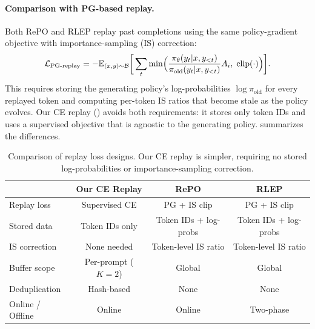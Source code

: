 \paragraph{Comparison with PG-based replay.}
Both RePO \citep{li2025repo} and RLEP \citep{zhang2025rlep} replay past completions using the same policy-gradient objective with importance-sampling (IS) correction:
\[
\mathcal{L}_{\mathrm{PG\text{-}replay}} = -\mathbb{E}_{(x,y)\sim\mathcal{B}}\bigg[\sum_t \min\!\Big(\frac{\pi_{\theta}(y_t|x,y_{<t})}{\pi_{\mathrm{old}}(y_t|x,y_{<t})} A_i,\;\mathrm{clip}(\cdot)\Big)\bigg].
\]
This requires storing the generating policy's log-probabilities $\log\pi_{\mathrm{old}}$ for every replayed token and computing per-token IS ratios that become stale as the policy evolves.
Our CE replay () avoids both requirements: it stores only token IDs and uses a supervised objective that is agnostic to the generating policy.
 summarizes the differences.

\begin{table}[t]
\centering
\caption{Comparison of replay loss designs. Our CE replay is simpler, requiring no stored log-probabilities or importance-sampling correction.}
\label{tab:replay_compare}
\small
\begin{tabular}{lccc}
\toprule
& \textbf{Our CE Replay} & \textbf{RePO} & \textbf{RLEP} \\
\midrule
Replay loss & Supervised CE & PG + IS clip & PG + IS clip \\
Stored data & Token IDs only & Token IDs + log-probs & Token IDs + log-probs \\
IS correction & None needed & Token-level IS ratio & Token-level IS ratio \\
Buffer scope & Per-prompt ($K{=}2$) & Global & Global \\
Deduplication & Hash-based & None & None \\
Online / Offline & Online & Online & Two-phase \\
\bottomrule
\end{tabular}
\end{table}
